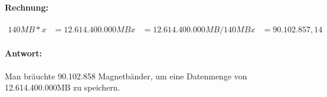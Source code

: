 \documentclass[11pt,a4paper]{article}
\begin{document}
\paragraph{Rechnung:}
\begin{align}
    140MB*x &= 12.614.400.000MB
    x &= 12.614.400.000MB/140MB
    x &= 90.102.857,14
\end{align}

\paragraph{Antwort:}
    Man bräuchte 90.102.858 Magnetbänder, um eine Datenmenge von 12.614.400.000MB zu speichern.


\newpage



\end{document}
